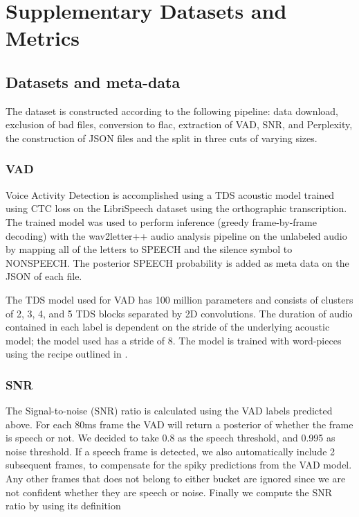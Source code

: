 \documentclass{article}
\begin{document}
\vspace{-5pt}






\setcounter{section}{0}
\setcounter{table}{0}
\setcounter{figure}{0}

\renewcommand\thesection{S\arabic{section}}
\renewcommand\thetable{S\arabic{table}}
\renewcommand\thefigure{S\arabic{figure}}

\section{Supplementary Datasets and Metrics}\label{sec:supmeth}
\subsection{Datasets and meta-data}

The dataset is constructed according to the following pipeline:
data download, exclusion of bad files, conversion to flac, extraction of VAD, SNR, and Perplexity, the construction of JSON files and the split in three cuts of varying sizes.  

\subsubsection{VAD}\label{sec:supvad}
Voice Activity Detection is accomplished using a TDS acoustic model \cite{hannun2019tds} trained using CTC loss \cite{graves2006connectionist} on the LibriSpeech dataset using the orthographic transcription. The trained model was used to perform inference (greedy frame-by-frame decoding) with the wav2letter++\cite{wav2letter++} audio analysis pipeline on the unlabeled audio by mapping all of the letters to \textsc{SPEECH} and the silence symbol to \textsc{NONSPEECH}. The posterior \textsc{SPEECH} probability is added as meta data on the JSON of each file.

The TDS model used for VAD has 100 million parameters and consists of clusters of 2, 3, 4, and 5 TDS blocks separated by 2D convolutions. The duration of audio contained in each label is dependent on the stride of the underlying acoustic model; the model used has a stride of 8. The model is trained with word-pieces using the recipe outlined in \cite{hannun2019tds}. 


\subsubsection{SNR}\label{sec:supsnr}
The Signal-to-noise (SNR) ratio is calculated using the VAD labels predicted above. For each 80ms frame the VAD will return a posterior of whether the frame is speech or not. We decided to take  0.8 as the speech threshold, and  0.995 as noise threshold. If a speech frame is detected, we also automatically include 2 subsequent frames, to compensate for the spiky predictions from the VAD model. Any other frames that does not belong to either bucket are ignored since we are not confident whether they are speech or noise. Finally we compute the SNR ratio by using its definition 
\end{document}
